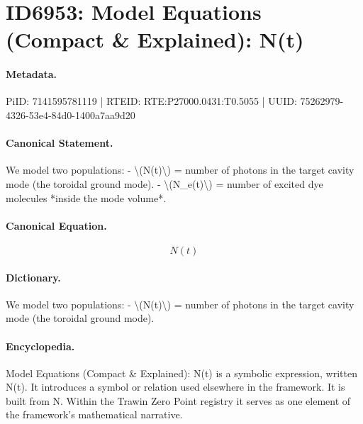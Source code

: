 \section*{ID6953: Model Equations (Compact \& Explained): N(t)}
\paragraph{Metadata.}
PiID: 7141595781119 | RTEID: RTE:P27000.0431:T0.5055 | UUID: 75262979-4326-53e4-84d0-1400a7aa9d20

\paragraph{Canonical Statement.}
We model two populations: - \textbackslash{}(N(t)\textbackslash{}) = number of photons in the target cavity mode (the toroidal ground mode). - \textbackslash{}(N\_e(t)\textbackslash{}) = number of excited dye molecules *inside the mode volume*.

\paragraph{Canonical Equation.}
\[
N(t)
\]

\paragraph{Dictionary.}
We model two populations: - \textbackslash{}(N(t)\textbackslash{}) = number of photons in the target cavity mode (the toroidal ground mode).

\paragraph{Encyclopedia.}
Model Equations (Compact \& Explained): N(t) is a symbolic expression, written N(t). It introduces a symbol or relation used elsewhere in the framework. It is built from N. Within the Trawin Zero Point registry it serves as one element of the framework's mathematical narrative.
